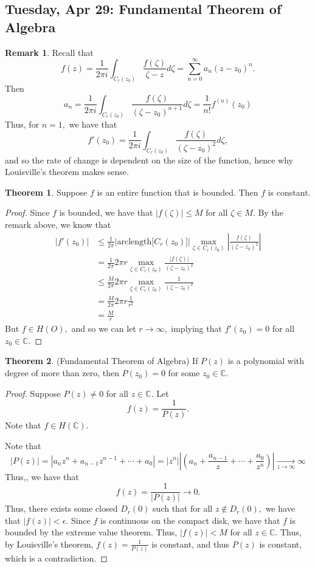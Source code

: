 \documentclass[10pt, oneside]{article}
\newcommand{\bbC}{\mathbb{C}}
\theoremstyle{definition}
\newtheorem{thm}{Theorem}
\newtheorem{rem}{Remark}
\begin{document}
\newpage
\subsection{Tuesday, Apr 29: Fundamental Theorem of Algebra}
\begin{rem}
    Recall that 
    \[f(z) = \frac{1}{2\pi i }\int_{C_r(z_0)}\frac{f(\zeta)}{\zeta - z}d\zeta = \sum_{n=0}^\infty a_n (z- z_0)^n.\] Then
    \[a_n = \frac{1}{2\pi i}\int_{C_{r}(z_0)}\frac{f(\zeta)}{(\zeta - z_0)^{n+1}}d\zeta = \frac{1}{n!}f^{(n)}(z_0)\]
Thus, for $n = 1,$ we have that 
\[f'(z_0) = \frac{1}{2\pi i} \int_{C_r(z_0)}\frac{f(\zeta)}{(\zeta- z_0)^2}d\zeta,\] and so the rate of change is dependent on the size of the function, hence why Louisville's theorem makes sense.
\end{rem}
\begin{thm}
    Suppose $f$ is an entire function that is bounded. Then $f$ is constant.
\end{thm}
\begin{proof}
Since $f$ is bounded, we have that $|f(\zeta)| \leq M$ for all $\zeta\in M.$
    By the remark above, we know that 
    \begin{align*}
        |f
        '(z_0)| &\leq \frac{1}{2\pi }\big|\text{arclength}\big[C_r(z_0)\big]\big| \max_{\zeta \in C_r(z_0)} |\frac{f(\zeta)}{(\zeta - z_0)^2}|\\
        &= \frac{1}{2\pi }2\pi r   \max_{\zeta \in C_r(z_0)} \frac{|f(\zeta)|}{(\zeta - z_0)^2}\\
        &\leq \frac{M}{2\pi }2\pi  r  \max_{\zeta \in C_r(z_0)} \frac{1}{(\zeta - z_0)^2}\\
        &= \frac{M}{2\pi }2\pi r \frac{1}{r^2}\\
        &= \frac{M}{r}
    \end{align*}
    But $f \in H(O),$ and so we can let $r\to \infty,$ implying that $f'(z_0) = 0$ for all $z_0 \in \bbC.$
\end{proof}

\begin{thm}
    (Fundamental Theorem of Algebra) If $P(z)$ is a polynomial with degree of more than zero, then $P(z_0) = 0$ for some $z_0 \in \bbC.$
\end{thm}
\begin{proof}
    Suppose $P(z) \neq 0$ for all $z \in \bbC.$ Let 
    \[f(z) = \frac{1}{P(z)}.\] Note that $f \in H(\bbC).$ 

    Note that 
    \[|P(z)| = |a_nz^n + a_{n-1}z^{n-1} + \cdots + a_0| = |z^n|\left|(a_n + \frac{a_{n-1}}{z} + \cdots + \frac{a_0}{z^n})\right| \xrightarrow[z\to \infty]{} \infty\] Thus,, we have that 
    \[f(z) = \frac{1}{|P(z)|}\to 0.\] Thus, there exists some closed $D_r(0)$ such that for all $z\notin D_r(0),$ we have that $|f(z)| < \epsilon.$ Since $f$ is continuous on the compact disk, we have that $f$ is bounded by the extreme value theorem. Thus, $|f(z)| < M$ for all $z\in \bbC.$ Thus, by Louisville's theorem, $f(z) = \frac{1}{P(z)}$ is constant, and thus $P(z)$ is constant, which is a contradiction.
\end{proof}
\end{document}
